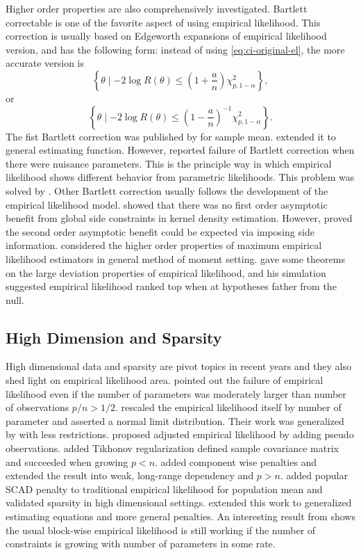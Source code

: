 Higher order properties are also comprehensively investigated. Bartlett
correctable is one of the favorite aspect of using empirical likelihood.
This correction is usually based on Edgeworth expansions of empirical
likelihood version, and has the following form: instead of using \ref{eq:ci-original-el},
the more accurate version is 
\[
\left\{ \theta\mid-2\log R\left(\theta\right)\le\left(1+\frac{a}{n}\right)\chi_{p,1-\alpha}^{2}\right\} ,
\]
or 
\[
\left\{ \theta\mid-2\log R\left(\theta\right)\le\left(1-\frac{a}{n}\right)^{-1}\chi_{p,1-\alpha}^{2}\right\} .
\]
The fist Bartlett correction was published by \citet{diciccio1991empirical}
for sample mean. \citet{zhang1996accuracy} extended it to general
estimating function. However, \citet{lazar1999empirical} reported
failure of Bartlett correction when there were nuisance parameters.
This is the principle way in which empirical likelihood shows different
behavior from parametric likelihoods. This problem was solved by \citet{chen2006bartlett}.
Other Bartlett correction usually follows the development of the empirical
likelihood model. \citet{biao1998note} showed that there was no first
order asymptotic benefit from global side constraints in kernel density
estimation. However, \citet{chen1997empirical} proved the second
order asymptotic benefit could be expected via imposing side information.
\citet{newey2004higher} considered the higher order properties of
maximum empirical likelihood estimators in general method of moment
setting. \citet{kitamura2001asymptotic} gave some theorems on the
large deviation properties of empirical likelihood, and his simulation
suggested empirical likelihood ranked top when at hypotheses father
from the null. 


\subsection{High Dimension and Sparsity}

High dimensional data and sparsity are pivot topics in recent years
and they also shed light on empirical likelihood area. \citet{tsao2004bounds}
pointed out the failure of empirical likelihood even if the number
of parameters was moderately larger than number of observations $p/n>1/2$.
\citet{hjort2009extending} rescaled the empirical likelihood itself
by number of parameter and asserted a normal limit distribution. Their
work was generalized by \citet{chen2009effects} with less restrictions.
\citet{chen2008adjusted,emerson2009calibration} proposed adjusted
empirical likelihood by adding pseudo observations. \citet{bartolucci2007penalized}
added Tikhonov regularization defined sample covariance matrix and
succeeded when growing $p<n$. \citet{lahiri2012penalized} added
component wise penalties and extended the result into weak, long-range
dependency and $p>n$. \citet{tang2010penalized} added popular SCAD
penalty to traditional empirical likelihood for population mean and
validated sparsity in high dimensional settings. \citet{leng2012penalized}
extended this work to generalized estimating equations and more general
penalties. An interesting result from \citet{chang2015high} shows
the usual block-wise empirical likelihood is still working if the
number of constraints is growing with number of parameters in some
rate.



